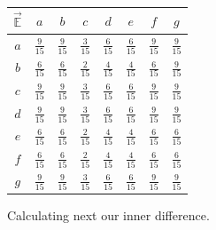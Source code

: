 \documentclass[a4paper, 10pt, twocolumn]{article}
\begin{document}
\begin{center}
       \begin{tabular}{c|ccccccc}
              $ \vec{\mathbb{E}} $ & $ a $ & $ b $ & $ c $ & $ d $ & $ e $ & $ f $ & $ g $ \\
              \hline
              $ a $ & $ \frac{9}{15} $ & $ \frac{9}{15} $ & $ \frac{3}{15} $ & $ \frac{6}{15} $ & $ \frac{6}{15} $ & $ \frac{9}{15} $ & $ \frac{9}{15} $ \\
              $ b $ & $ \frac{6}{15} $ & $ \frac{6}{15} $ & $ \frac{2}{15} $ & $ \frac{4}{15} $ & $ \frac{4}{15} $ & $ \frac{6}{15} $ & $ \frac{9}{15} $ \\
              $ c $ & $ \frac{9}{15} $ & $ \frac{9}{15} $ & $ \frac{3}{15} $ & $ \frac{6}{15} $ & $ \frac{6}{15} $ & $ \frac{9}{15} $ & $ \frac{9}{15} $ \\
              $ d $ & $ \frac{9}{15} $ & $ \frac{9}{15} $ & $ \frac{3}{15} $ & $ \frac{6}{15} $ & $ \frac{6}{15} $ & $ \frac{9}{15} $ & $ \frac{9}{15} $ \\
              $ e $ & $ \frac{6}{15} $ & $ \frac{6}{15} $ & $ \frac{2}{15} $ & $ \frac{4}{15} $ & $ \frac{4}{15} $ & $ \frac{6}{15} $ & $ \frac{6}{15} $ \\
              $ f $ & $ \frac{6}{15} $ & $ \frac{6}{15} $ & $ \frac{2}{15} $ & $ \frac{4}{15} $ & $ \frac{4}{15} $ & $ \frac{6}{15} $ & $ \frac{6}{15} $ \\
              $ g $ & $ \frac{9}{15} $ & $ \frac{9}{15} $ & $ \frac{3}{15} $ & $ \frac{6}{15} $ & $ \frac{6}{15} $ & $ \frac{9}{15} $ & $ \frac{9}{15} $ \\
       \end{tabular}
\end{center}

\noindent
Calculating next our inner difference.
\end{document}
